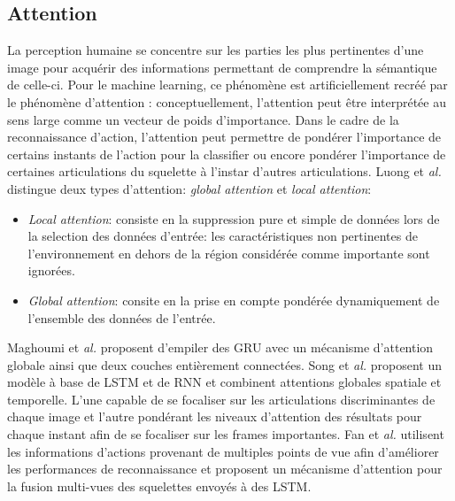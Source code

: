 \subsection{Attention}
La perception humaine se concentre sur les parties les plus pertinentes d'une image pour acquérir des informations permettant de comprendre la sémantique de celle-ci. Pour le machine learning, ce phénomène est artificiellement recréé  par le phénomène d'attention \cite{bahdanau2014neural,2017arXiv170603762V}: conceptuellement, l'attention peut être interprétée au sens large comme un vecteur de poids d'importance. 
Dans le cadre de la reconnaissance d'action, l'attention peut permettre de pondérer l'importance de certains instants de l'action pour la classifier ou encore pondérer l'importance de certaines articulations du squelette à l'instar d'autres articulations.
Luong et \textit{al.}\cite{luong2015effective} distingue deux types d'attention: \textit{global attention} et \textit{local attention}:
 \begin{itemize}
     \item \textit{Local attention}: consiste en la suppression pure et simple de données lors de la selection des données d'entrée: les caractéristiques non pertinentes de l'environnement en dehors de la région considérée comme importante sont ignorées.
     \item \textit{Global attention}: consite en la prise en compte pondérée dynamiquement de l'ensemble des données de l'entrée.
 \end{itemize}
 
 

Maghoumi et\textit{ al.}\cite{maghoumi2019deepgru} proposent d'empiler des GRU avec un mécanisme d'attention globale ainsi que deux couches entièrement connectées. Song et\textit{ al.}\cite{song2017end} proposent un modèle à base de LSTM et de RNN et combinent attentions globales spatiale et temporelle. L'une capable de se focaliser sur les articulations discriminantes de chaque image et  l'autre pondérant les niveaux d'attention des résultats pour chaque instant afin de se focaliser sur les frames importantes. Fan et\textit{ al.}\cite{Fan2019AttentionBasedMR} utilisent les informations d'actions provenant de multiples points de vue afin d'améliorer les performances de reconnaissance et proposent un mécanisme d'attention pour la fusion multi-vues des squelettes envoyés à des LSTM. 

